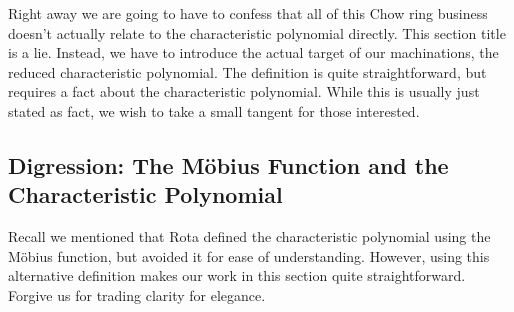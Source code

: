 \documentclass[12pt,oneside]{../../sfsuthesis}
\begin{document}
Right away we are going to have to confess that all of this Chow ring business doesn't actually relate to the characteristic polynomial directly.
This section title is a lie.
Instead, we have to introduce the actual target of our machinations, the reduced characteristic polynomial.
The definition is quite straightforward, but requires a fact about the characteristic polynomial.
While this is usually just stated as fact, we wish to take a small tangent for those interested.

\subsection{Digression: The M\"obius Function and the Characteristic Polynomial}
Recall we mentioned that Rota defined the characteristic polynomial using the M\"obius function, but avoided it for ease of understanding.
However, using this alternative definition makes our work in this section quite straightforward.
Forgive us for trading clarity for elegance.
\end{document}
